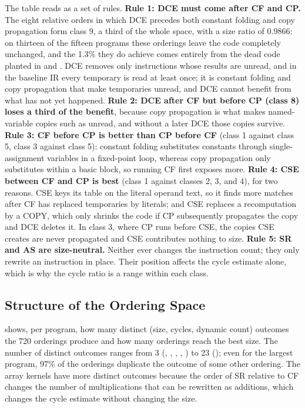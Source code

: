 The table reads as a set of rules. \textbf{Rule 1: DCE must come after CF and CP.} The eight relative orders in which DCE precedes both constant folding and copy propagation form class 9, a third of the whole space, with a size ratio of 0.9866: on thirteen of the fifteen programs these orderings leave the code completely unchanged, and the 1.3\% they do achieve comes entirely from the dead code planted in  and . DCE removes only instructions whose results are unread, and in the baseline IR every temporary is read at least once; it is constant folding and copy propagation that make temporaries unread, and DCE cannot benefit from what has not yet happened. \textbf{Rule 2: DCE after CF but before CP (class 8) loses a third of the benefit}, because copy propagation is what makes named-variable copies such as  unread, and without a later DCE those copies survive. \textbf{Rule 3: CF before CP is better than CP before CF} (class 1 against class 5, class 3 against class 5): constant folding substitutes constants through single-assignment variables in a fixed-point loop, whereas copy propagation only substitutes within a basic block, so running CF first exposes more. \textbf{Rule 4: CSE between CF and CP is best} (class 1 against classes 2, 3, and 4), for two reasons. CSE keys its table on the literal operand text, so it finds more matches after CF has replaced temporaries by literals; and CSE replaces a recomputation by a COPY, which only shrinks the code if CP subsequently propagates the copy and DCE deletes it. In class 3, where CP runs before CSE, the copies CSE creates are never propagated and CSE contributes nothing to size. \textbf{Rule 5: SR and AS are size-neutral.} Neither ever changes the instruction count; they only rewrite an instruction in place. Their position affects the cycle estimate alone, which is why the cycle ratio is a range within each class.

\subsection{Structure of the Ordering Space}

 shows, per program, how many distinct (size, cycles, dynamic count) outcomes the 720 orderings produce and how many orderings reach the best size. The number of distinct outcomes ranges from 3 (, , , , ) to 23 (\code{2mm}); even for the largest program, 97\% of the orderings duplicate the outcome of some other ordering. The array kernels have more distinct outcomes because the order of SR relative to CF changes the number of multiplications that can be rewritten as additions, which changes the cycle estimate without changing the size.

